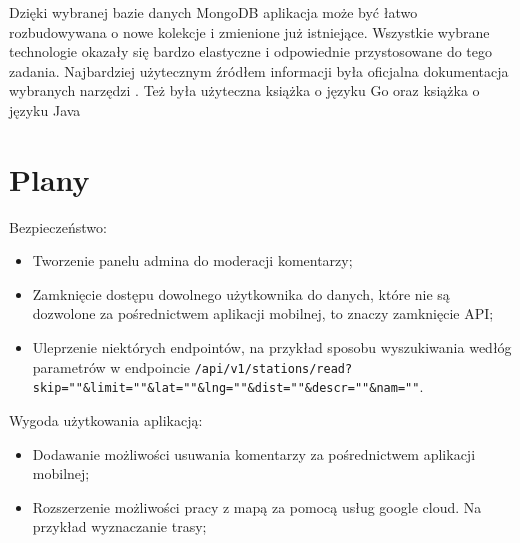 Dzięki wybranej bazie danych MongoDB aplikacja może być łatwo rozbudowywana o nowe kolekcje i zmienione już istniejące. Wszystkie wybrane technologie okazały się bardzo elastyczne i odpowiednie przystosowane do tego zadania.
Najbardziej użytecznym źródłem informacji była oficjalna dokumentacja wybranych narzędzi \cite{android_doc,godoc,golang2,mongoDB_doc}. Też była użyteczna książka o języku Go \cite{LearninGo} oraz książka o języku Java \cite{javabook}
%
\section{Plany}
\label{sec:plany}

Bezpieczeństwo:
\begin{itemize}
    \item Tworzenie panelu admina do moderacji komentarzy;
    \item Zamknięcie dostępu dowolnego użytkownika do danych, które nie są dozwolone za pośrednictwem aplikacji mobilnej, to znaczy zamknięcie API;
    \item Uleprzenie niektórych endpointów, na przykład sposobu wyszukiwania wedłóg parametrów w endpoincie \texttt{/api/v1/stations/read?skip=""\&limit=""\&lat=""\&lng=""\&dist=""\&descr=""\&nam=""}.
\end{itemize}

Wygoda użytkowania aplikacją:
\begin{itemize}
    \item Dodawanie możliwości usuwania komentarzy za pośrednictwem aplikacji mobilnej;
    \item Rozszerzenie możliwości pracy z mapą za pomocą usług google cloud. Na przykład wyznaczanie trasy;
\end{itemize}